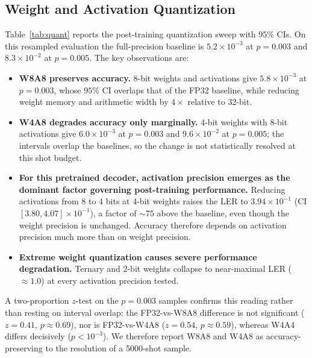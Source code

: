 ﻿\documentclass[conference]{IEEEtran}
\begin{document}
\subsection{Weight and Activation Quantization}
Table~\ref{tab:quant} reports the post-training quantization sweep with
$95\%$ CIs. On this resampled evaluation the full-precision baseline is
$5.2\times10^{-3}$ at $p{=}0.003$ and $8.3\times10^{-2}$ at $p{=}0.005$.
The key observations are:
\begin{itemize}
\item \textbf{W8A8 preserves accuracy.} 8-bit weights and activations give
      $5.8\times10^{-3}$ at $p{=}0.003$, whose $95\%$ CI overlaps that of
      the FP32 baseline, while reducing weight memory and arithmetic width
      by $4\times$ relative to 32-bit.
\item \textbf{W4A8 degrades accuracy only marginally.} 4-bit weights with
      8-bit activations give $6.0\times10^{-3}$ at $p{=}0.003$ and
      $9.6\times10^{-2}$ at $p{=}0.005$; the intervals overlap the
      baselines, so the change is not statistically resolved at this shot
      budget.
\item \textbf{For this pretrained decoder, activation precision emerges as the dominant factor governing post-training performance.} Reducing activations
      from 8 to 4 bits at 4-bit weights raises the LER to
      $3.94\times10^{-1}$ (CI $[3.80,4.07]\times10^{-1}$), a factor of
      $\sim75$ above the baseline, even though the weight precision is
      unchanged. Accuracy therefore depends on activation precision much
      more than on weight precision.
\item \textbf{Extreme weight quantization causes severe performance degradation.} Ternary and 2-bit weights
      collapse to near-maximal LER ($\approx1.0$) at every activation
      precision tested.
\end{itemize}
A two-proportion $z$-test on the $p{=}0.003$ samples confirms this reading
rather than resting on interval overlap: the FP32-vs-W8A8 difference is not
significant ($z{=}0.41$, $p{\approx}0.69$), nor is FP32-vs-W4A8
($z{=}0.54$, $p{\approx}0.59$), whereas W4A4 differs decisively
($p<10^{-3}$). We therefore report W8A8 and W4A8 as accuracy-preserving to
the resolution of a 5000-shot sample.
\end{document}
